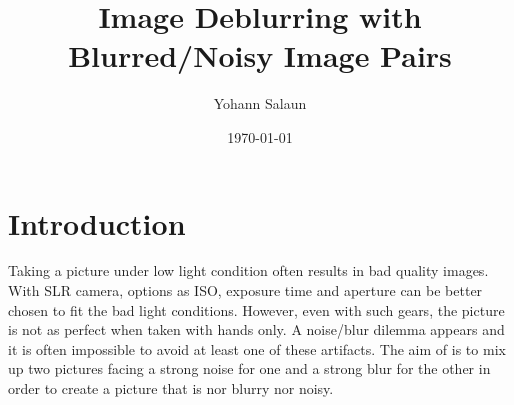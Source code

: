 \documentclass{article}
\title{Image Deblurring with Blurred/Noisy Image Pairs}
\author{Yohann Salaun}
\date{\today}
\begin{document}
\maketitle

\section{Introduction}

Taking a picture under low light condition often results in bad quality images. With SLR camera, options as ISO, exposure time and aperture can be better chosen to fit the bad light conditions. However, even with such gears, the picture is not as perfect when taken with hands only. A noise/blur dilemma appears and it is often impossible to avoid at least one of these artifacts. The aim of \cite{deblur_denoise} is to mix up two pictures facing a strong noise for one and a strong blur for the other in order to create a picture that is nor blurry nor noisy.
\end{document}
